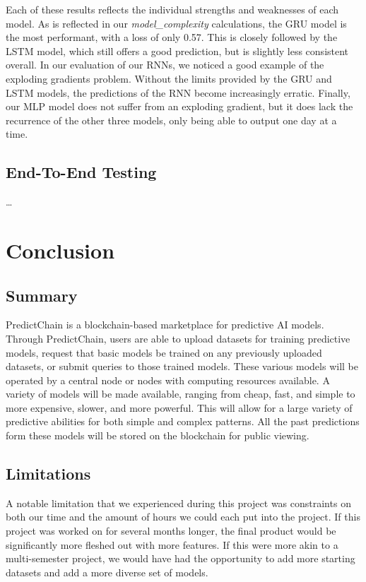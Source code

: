 \documentclass{article}
\begin{document}
    Each of these results reflects the individual strengths and weaknesses of each model.  As is reflected in our
    \textit{model\_complexity} calculations, the GRU model is the most performant, with a loss of only 0.57.  This is
    closely followed by the LSTM model, which still offers a good prediction, but is slightly less consistent overall.
    In our evaluation of our RNNs, we noticed a good example of the exploding gradients problem.  Without the limits
    provided by the GRU and LSTM models, the predictions of the RNN become increasingly erratic.  Finally, our
    MLP model does not suffer from an exploding gradient, but it does lack the recurrence of the other three models,
    only being able to output one day at a time.

    \subsection{End-To-End Testing}

    \ldots

    \section{Conclusion}

    \subsection{Summary}

    PredictChain is a blockchain-based marketplace for predictive AI models.
    Through PredictChain, users are able to upload datasets for training predictive models, request that basic models
    be trained on any previously uploaded datasets, or submit queries to those trained models.
    These various models will be operated by a central node or nodes with computing resources available. A variety of
    models will be made available, ranging from cheap, fast, and simple to more expensive, slower, and more powerful.
    This will allow for a large variety of predictive abilities for both simple and complex patterns.  All the past predictions
    form these models will be stored on the blockchain for public viewing.

    \subsection{Limitations}

    A notable limitation that we experienced during this project was constraints on both our time and the amount of
    hours we could each put into the project.  If this project was worked on for several months longer, the final product
    would be significantly more fleshed out with more features.  If this were more akin to a multi-semester project,
    we would have had the opportunity to add more starting datasets and add a more diverse set of models.
\end{document}
